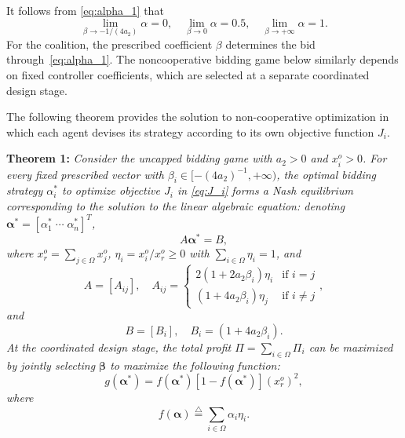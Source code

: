 \documentclass[journal]{IEEEtran}
\begin{document}
It follows from \eqref{eq:alpha_1} that
\[ \lim_{\beta\rightarrow-1/(4a_2)} \alpha = 0, \quad  \lim_{\beta\rightarrow0} \alpha = 0.5, \quad \lim_{\beta\rightarrow +\infty} \alpha = 1. \]
For the coalition, the prescribed coefficient $\beta$ determines the bid through~\eqref{eq:alpha_1}. The noncooperative bidding game below similarly depends on fixed controller coefficients, which are selected at a separate coordinated design stage.

The following theorem provides the solution to non-cooperative optimization in which each agent devises its strategy according to its own objective function $J_i$. 

\noindent \textbf{Theorem 1:} {\it Consider the uncapped bidding game with $a_2>0$ and $x_i^o>0$. For every fixed prescribed vector with $\beta_i\in[-(4a_2)^{-1},+\infty)$, the optimal bidding strategy $\alpha_i^*$ to optimize objective $J_i$ in \eqref{eq:J_i} forms a Nash equilibrium corresponding to the solution to the linear algebraic equation:
denoting $\boldsymbol{\alpha}^*=[\alpha_1^* \; \cdots \; \alpha_n^*]^T$,
\begin{equation}
A \boldsymbol{\alpha}^* = B,
\label{eq:alpha_i}
\end{equation}
where $x_r^o = \sum_{j\in\Omega} x_j^o$, $\eta_i = x_i^o/x_r^o\geq0$ with $\sum_{i\in\Omega} \eta_i=1$, and
\[ A=[A_{ij}], \quad A_{ij} = \left\{ \begin{array}{ll} 2(1+2a_2\beta_i)\eta_i & \mbox{if $i=j$} \\
(1+4a_2\beta_i)\eta_j & \mbox{if $i\not=j$}\end{array} \right., \]
and
\[ B=[B_i], \quad B_i = (1+4a_2\beta_i). \]
At the coordinated design stage, the total profit $\Pi=\sum_{i\in\Omega}\Pi_i$ can be maximized by jointly selecting $\boldsymbol\beta$ to maximize the following function:
\begin{equation} 
g(\boldsymbol{\alpha}^*) = f(\boldsymbol{\alpha}^*) \left[ 1 - f(\boldsymbol{\alpha}^*)  \right](x_r^o)^2,
\label{eq:G}
\end{equation} 
where  
\begin{equation} 
f(\boldsymbol{\alpha}) \stackrel{\triangle}{=} \sum_{i\in\Omega}  \alpha_i \eta_i.  
\label{eq:F}
\end{equation} 
}
\end{document}
